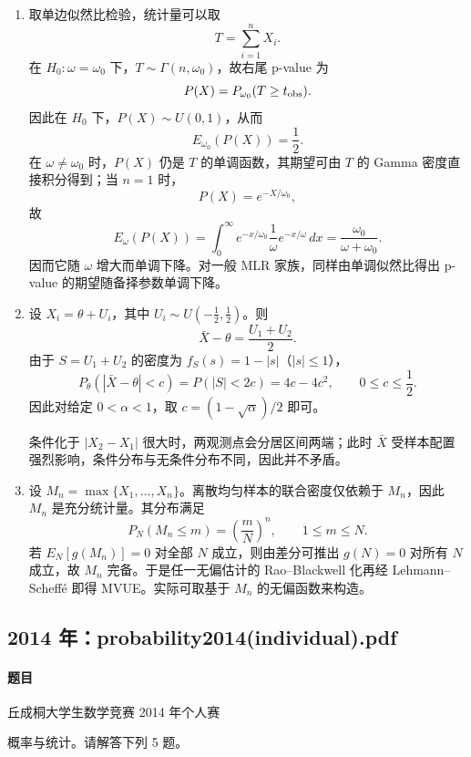 \documentclass[UTF8,12pt]{ctexart}
\begin{document}
\begin{enumerate}[label=\textbf{\arabic*.},leftmargin=2.2em]
\item 取单边似然比检验，统计量可以取
\[
T=\sum_{i=1}^n X_i.
\]
在 \(H_0:\omega=\omega_0\) 下，\(T\sim\Gamma(n,\omega_0)\)，故右尾 p-value 为
\[
P(X)=P_{\omega_0}(T\ge t_{\rm obs}).
\]
因此在 \(H_0\) 下，\(P(X)\sim U(0,1)\)，从而
\[
E_{\omega_0}(P(X))=\frac12.
\]
在 \(\omega\ne\omega_0\) 时，\(P(X)\) 仍是 \(T\) 的单调函数，其期望可由 \(T\) 的 Gamma 密度直接积分得到；当 \(n=1\) 时，
\[
P(X)=e^{-X/\omega_0},
\]
故
\[
E_\omega(P(X))=\int_0^\infty e^{-x/\omega_0}\frac1\omega e^{-x/\omega}\,dx
=\frac{\omega_0}{\omega+\omega_0}.
\]
因而它随 \(\omega\) 增大而单调下降。对一般 MLR 家族，同样由单调似然比得出 p-value 的期望随备择参数单调下降。

\item 设 \(X_i=\theta+U_i\)，其中 \(U_i\sim U(-\tfrac12,\tfrac12)\)。则
\[
\bar X-\theta=\frac{U_1+U_2}{2}.
\]
由于 \(S=U_1+U_2\) 的密度为 \(f_S(s)=1-|s|\)（\(|s|\le1\)），
\[
P_\theta(|\bar X-\theta|<c)=P(|S|<2c)=4c-4c^2,\qquad 0\le c\le \frac12.
\]
因此对给定 \(0<\alpha<1\)，取 \(c=(1-\sqrt{\alpha})/2\) 即可。

条件化于 \(|X_2-X_1|\) 很大时，两观测点会分居区间两端；此时 \(\bar X\) 受样本配置强烈影响，条件分布与无条件分布不同，因此并不矛盾。

\item 设 \(M_n=\max\{X_1,\dots,X_n\}\)。离散均匀样本的联合密度仅依赖于 \(M_n\)，因此 \(M_n\) 是充分统计量。其分布满足
\[
P_N(M_n\le m)=\left(\frac{m}{N}\right)^n,\qquad 1\le m\le N.
\]
若 \(E_N[g(M_n)]=0\) 对全部 \(N\) 成立，则由差分可推出 \(g(N)=0\) 对所有 \(N\) 成立，故 \(M_n\) 完备。于是任一无偏估计的 Rao--Blackwell 化再经 Lehmann--Scheffé 即得 MVUE。实际可取基于 \(M_n\) 的无偏函数来构造。
\end{enumerate}

\subsection{2014 年：probability2014(individual).pdf}
\paragraph{题目}
丘成桐大学生数学竞赛 2014 年个人赛

概率与统计。请解答下列 5 题。
\end{document}
